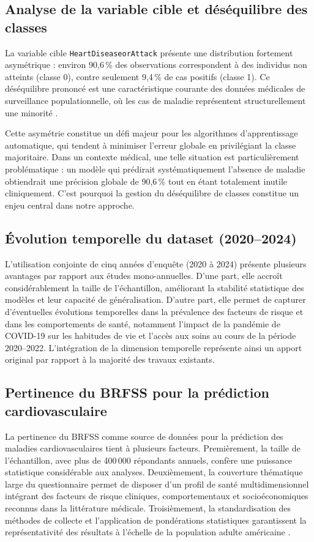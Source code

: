 \documentclass[12pt,a4paper]{report}
\begin{document}
\subsection{Analyse de la variable cible et déséquilibre des classes}

La variable cible \texttt{HeartDiseaseorAttack} présente une distribution fortement
asymétrique : environ 90,6\,\% des observations correspondent à des individus non
atteints (classe 0), contre seulement 9,4\,\% de cas positifs (classe 1). Ce
déséquilibre prononcé est une caractéristique courante des données médicales de
surveillance populationnelle, où les cas de maladie représentent structurellement
une minorité \cite{he2009}.

Cette asymétrie constitue un défi majeur pour les algorithmes d'apprentissage
automatique, qui tendent à minimiser l'erreur globale en privilégiant la classe
majoritaire. Dans un contexte médical, une telle situation est particulièrement
problématique : un modèle qui prédirait systématiquement l'absence de maladie
obtiendrait une précision globale de 90,6\,\% tout en étant totalement inutile
cliniquement. C'est pourquoi la gestion du déséquilibre de classes constitue un
enjeu central dans notre approche.

\subsection{Évolution temporelle du dataset (2020--2024)}

L'utilisation conjointe de cinq années d'enquête (2020 à 2024) présente plusieurs
avantages par rapport aux études mono-annuelles. D'une part, elle accroît
considérablement la taille de l'échantillon, améliorant la stabilité statistique des
modèles et leur capacité de généralisation. D'autre part, elle permet de capturer
d'éventuelles évolutions temporelles dans la prévalence des facteurs de risque et
dans les comportements de santé, notamment l'impact de la pandémie de COVID-19 sur
les habitudes de vie et l'accès aux soins au cours de la période 2020--2022.
L'intégration de la dimension temporelle représente ainsi un apport original par
rapport à la majorité des travaux existants.

\subsection{Pertinence du BRFSS pour la prédiction cardiovasculaire}

La pertinence du \acs{BRFSS} comme source de données pour la prédiction des maladies
cardiovasculaires tient à plusieurs facteurs. Premièrement, la taille de
l'échantillon, avec plus de 400\,000 répondants annuels, confère une puissance
statistique considérable aux analyses. Deuxièmement, la couverture thématique large
du questionnaire permet de disposer d'un profil de santé multidimensionnel intégrant
des facteurs de risque cliniques, comportementaux et socioéconomiques reconnus dans
la littérature médicale. Troisièmement, la standardisation des méthodes de collecte
et l'application de pondérations statistiques garantissent la représentativité des
résultats à l'échelle de la population adulte américaine \cite{mokdad2003}.
\end{document}
